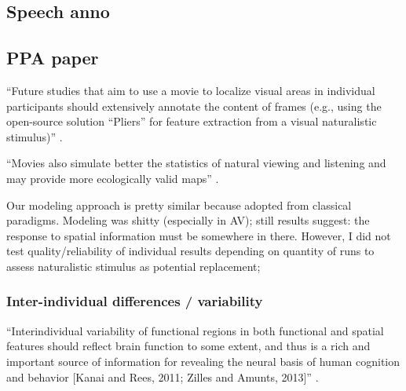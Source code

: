 \subsection{Speech anno}



\subsection{PPA paper}




%
``Future studies that aim to use a movie to localize visual areas in individual
participants should extensively annotate the content of frames (e.g., using the
open-source solution ``Pliers''\citep{mcnamara2017developing} for feature
extraction from a visual naturalistic stimulus)''
\citep{haeusler2022processing}.

%
``Movies also simulate better the statistics of natural viewing and listening
and may provide more ecologically valid maps'' \citep{jiahui2020predicting}.

%
Our modeling approach is pretty similar because adopted from classical
paradigms.
%
Modeling was shitty (especially in AV);
%
still results suggest: the response to spatial information must be somewhere in
there.
%
However, I did not test quality/reliability of individual results depending on
quantity of runs to assess naturalistic stimulus as potential replacement;


\subsubsection{Inter-individual differences / variability}


``Interindividual variability of functional regions in both functional and
spatial features should reflect brain function to some extent, and thus is a
rich and important source of information for revealing the neural basis of human
cognition and behavior [Kanai and Rees, 2011; Zilles and Amunts, 2013]''
\citep{zhen2015quantifying}.

